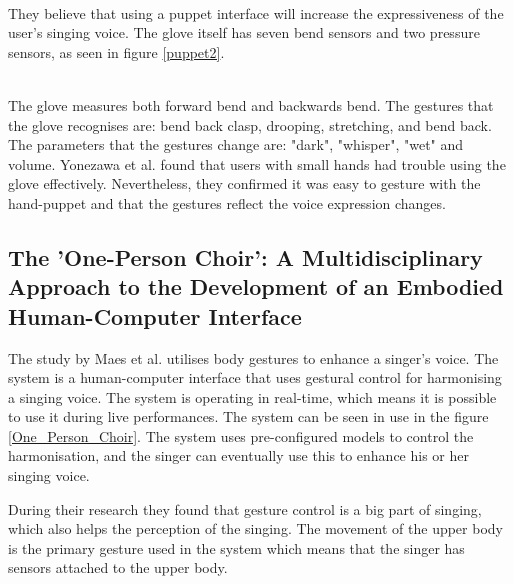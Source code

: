 \begin{minipage}{\linewidth}%
\label{puppet1}
\end{minipage}\\

They believe that using a puppet interface will increase the expressiveness of the user's singing voice. The glove itself has seven bend sensors and two pressure sensors, as seen in figure \ref{puppet2}. \\

\begin{minipage}{\linewidth}%
\label{puppet2}
\end{minipage}\\

The glove measures both forward bend and backwards bend. The gestures that the glove recognises are: bend back clasp, drooping, stretching, and bend back. The parameters that the gestures change are: "dark", "whisper", "wet" and volume. Yonezawa et al. found that users with small hands had trouble using the glove effectively. Nevertheless, they confirmed it was easy to gesture with the hand-puppet and that the gestures reflect the voice expression changes.

\subsection{The 'One-Person Choir': A Multidisciplinary Approach to the Development of an Embodied Human-Computer Interface}
The study by Maes et al. \citep{Maes_2011} utilises body gestures to enhance a singer's voice. The system is a human-computer interface that uses gestural control for harmonising a singing voice. The system is operating in real-time, which means it is possible to use it during live performances. The system can be seen in use in the figure \ref{One_Person_Choir}. The system uses pre-configured models to control the harmonisation, and the singer can eventually use this to enhance his or her singing voice. 

During their research they found that gesture control is a big part of singing, which also helps the perception of the singing. The movement of the upper body is the primary gesture used in the system which means that the singer has sensors attached to the upper body.\\

